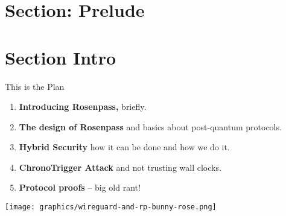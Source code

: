 \hypertarget{section-prelude}{%
\section{Section: Prelude}\label{section-prelude}}

\hypertarget{section-intro}{%
\section{Section Intro}\label{section-intro}}



\begin{frame}[s]{This is the Plan}
  \hypertarget{todays-talk}{}
  \begin{enumerate}
   \setlength{\itemsep}{1ex plus 1 fil}
    \item \textbf{Introducing Rosenpass,} briefly.
    \item \textbf{The design of Rosenpass} and basics about post-quantum protocols.
    \item \textbf{Hybrid Security} how it can be done and how we do it.
    \item \textbf{ChronoTrigger Attack} and not trusting wall clocks.
    \item \textbf{Protocol proofs} – big old rant!
  \end{enumerate}

  \begin{center}
    \texttt{[image: graphics/wireguard-and-rp-bunny-rose.png]}
  \end{center}
\end{frame}



